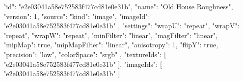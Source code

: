 {
  "id": "e2e03041a58e752583f477cd81e0e31b",
  "name": "Old House Roughness",
  "version": 1,
  "source": {
    "kind": "image",
    "imageId": "e2e03041a58e752583f477cd81e0e31b"
  },
  "settings": {
    "wrapU": "repeat",
    "wrapV": "repeat",
    "wrapW": "repeat",
    "minFilter": "linear",
    "magFilter": "linear",
    "mipMap": true,
    "mipMapFilter": "linear",
    "anisotropy": 1,
    "flipY": true,
    "precision": "low",
    "colorSpace": "srgb"
  },
  "textureIds": [
    "e2e03041a58e752583f477cd81e0e31b"
  ],
  "imageIds": [
    "e2e03041a58e752583f477cd81e0e31b"
  ]
}

